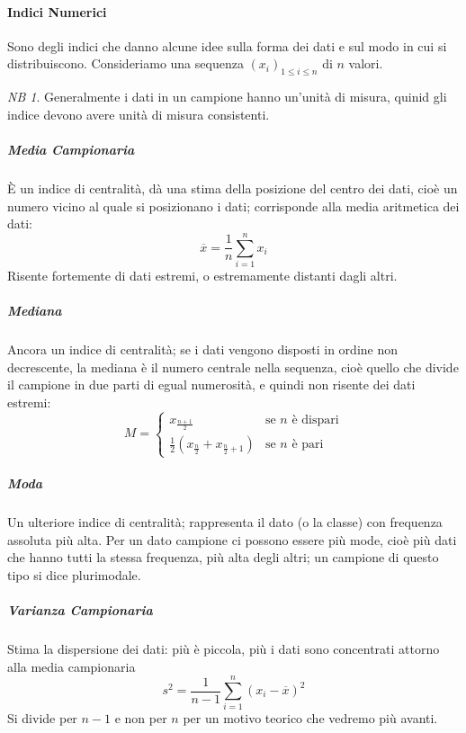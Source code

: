 \documentclass{article}
\theoremstyle{plain}
\theoremstyle{definition}
\theoremstyle{remark}
\newtheorem*{NB}{NB}
\begin{document}
\paragraph{Indici Numerici} %
\label{par:indici_numerici}
Sono degli indici che danno alcune idee sulla forma dei dati e sul modo in cui si distribuiscono. Consideriamo una sequenza $(x_i)_{1\leq i\leq n}$ di $n$ valori.
\begin{NB}
	Generalmente i dati in un campione hanno un'unità di misura, quinid gli indice devono avere unità di misura consistenti.
\end{NB}
\subparagraph{Media Campionaria} %
\label{subp:media_campionaria}
È un indice di centralità, dà una stima della posizione del centro dei dati, cioè un numero vicino al quale si posizionano i dati; corrisponde alla media aritmetica dei dati:
\begin{equation*}
	\overline{x}=\frac{1}{n}\sum_{i=1}^nx_i
\end{equation*}
Risente fortemente di dati estremi, o estremamente distanti dagli altri.
\subparagraph{Mediana} %
\label{subp:mediana}
Ancora un indice di centralità; se i dati vengono disposti in ordine non decrescente, la mediana è il numero centrale nella sequenza, cioè quello che divide il campione in due parti di egual numerosità, e quindi non risente dei dati estremi:
\begin{equation*}
	M=
	\begin{cases}
		x_{\frac{n+1}{2}}&\text{se }n\text{ è dispari}\\
		\frac{1}{2}(x_{\frac{n}{2}}+x_{\frac{n}{2}+1})&\text{se }n\text{ è pari}
	\end{cases}
\end{equation*}
\subparagraph{Moda} %
\label{subp:moda}
Un ulteriore indice di centralità; rappresenta il dato (o la classe) con frequenza assoluta più alta. Per un dato campione ci possono essere più mode, cioè più dati che hanno tutti la stessa frequenza, più alta degli altri; un campione di questo tipo si dice plurimodale.
\subparagraph{Varianza Campionaria} %
\label{subp:varianza_campionaria}
Stima la dispersione dei dati: più è piccola, più i dati sono concentrati attorno alla media campionaria
\begin{equation*}
	s^2=\frac{1}{n-1}\sum_{i=1}^n(x_i-\overline{x})^2
\end{equation*}
Si divide per $n-1$ e non per $n$ per un motivo teorico che vedremo più avanti.
\end{document}

